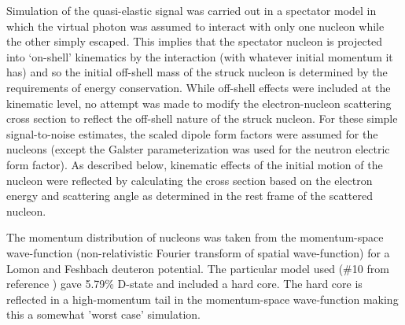 \documentclass[12pt,letterpaper,oneside]{article}
\begin{document}
\label{QE-simulation}
Simulation of the quasi-elastic signal was carried out in a spectator model
in which the virtual photon was assumed to interact with only one nucleon
while the other simply escaped.  This implies that the spectator
nucleon is projected into `on-shell' kinematics by the interaction
(with whatever initial momentum it has) and so the initial off-shell
mass of the struck nucleon is determined by the requirements of energy
conservation.  While off-shell effects were included at the kinematic
level, no attempt was made to modify the electron-nucleon scattering
cross section to reflect the off-shell nature of the struck nucleon.
For these simple signal-to-noise estimates, the scaled dipole
form factors were assumed for the nucleons (except the Galster
parameterization was used for the neutron electric form factor).
As described below, kinematic effects of the initial motion of 
the nucleon were reflected by
calculating the cross section based on the electron energy and
scattering angle as determined in the rest frame of the scattered
nucleon. 

The momentum distribution of nucleons was taken from the
momentum-space wave-function (non-relativistic Fourier transform of
spatial wave-function) for a Lomon and Feshbach deuteron
potential. The particular model used (\#10 from reference
\cite{Lomon}) gave 5.79\% D-state and included a hard core. The hard
core is reflected in a high-momentum tail in the momentum-space
wave-function making this a somewhat 'worst case' simulation.
\end{document}
